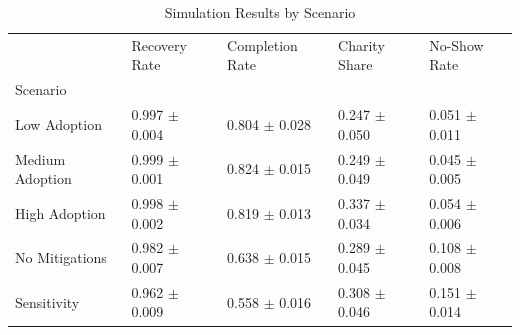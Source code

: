 \begin{table}
\caption{Simulation Results by Scenario}
\label{tab:results}
\begin{tabular}{lllll}
\toprule
 & Recovery Rate & Completion Rate & Charity Share & No-Show Rate \\
Scenario &  &  &  &  \\
\midrule
Low Adoption & 0.997 $\pm$ 0.004 & 0.804 $\pm$ 0.028 & 0.247 $\pm$ 0.050 & 0.051 $\pm$ 0.011 \\
Medium Adoption & 0.999 $\pm$ 0.001 & 0.824 $\pm$ 0.015 & 0.249 $\pm$ 0.049 & 0.045 $\pm$ 0.005 \\
High Adoption & 0.998 $\pm$ 0.002 & 0.819 $\pm$ 0.013 & 0.337 $\pm$ 0.034 & 0.054 $\pm$ 0.006 \\
No Mitigations & 0.982 $\pm$ 0.007 & 0.638 $\pm$ 0.015 & 0.289 $\pm$ 0.045 & 0.108 $\pm$ 0.008 \\
Sensitivity & 0.962 $\pm$ 0.009 & 0.558 $\pm$ 0.016 & 0.308 $\pm$ 0.046 & 0.151 $\pm$ 0.014 \\
\bottomrule
\end{tabular}
\end{table}
